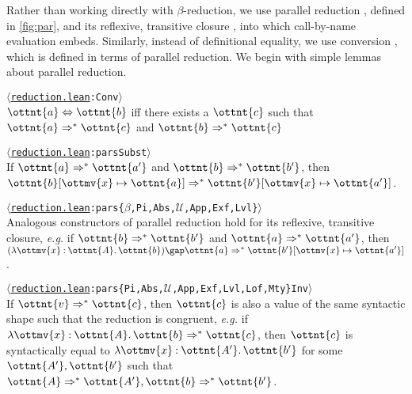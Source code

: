 \documentclass[a4paper,UKenglish,cleveref,autoref,thm-restate]{lipics-v2021}
\makeatletter
\newcommand{\repo}{https://github.com/ionathanch/TTBFL}
\newcommand{\eg}{\textit{e.g.}\@\xspace}
\newcommand{\thmref}[2]{%
  $\langle$\href{\repo/tree/main/src/#1}{\texttt{#1}}\texttt{:#2}$\rangle$%
}
\makeatother
\begin{document}
Rather than working directly with $\beta$-reduction,
we use parallel reduction ,
defined in \cref{fig:par},
and its reflexive, transitive closure ,
into which call-by-name evaluation embeds.
Similarly, instead of definitional equality,
we use conversion ,
which is defined in terms of parallel reduction.
We begin with simple lemmas about parallel reduction.

\begin{definition}[Conversion] \thmref{reduction.lean}{Conv} \\
  $ \ottnt{a}  \Leftrightarrow  \ottnt{b} $ iff there exists a $\ottnt{c}$ such that
  $ \ottnt{a}  \Rightarrow^\ast  \ottnt{c} $ and $ \ottnt{b}  \Rightarrow^\ast  \ottnt{c} $
\end{definition}

\begin{lemma}[Substitution (p.r.)] \thmref{reduction.lean}{parsSubst} \label{lem:pars:subst} \\
  If $ \ottnt{a}  \Rightarrow^\ast  \ottnt{a'} $ and $ \ottnt{b}  \Rightarrow^\ast  \ottnt{b'} $,
  then $  \ottnt{b} [  \ottmv{x}  \mapsto  \ottnt{a}  ]   \Rightarrow^\ast   \ottnt{b'} [  \ottmv{x}  \mapsto  \ottnt{a'}  ]  $.
\end{lemma}

\begin{lemma}[Construction (p.r.)] \thmref{reduction.lean}{pars\{$\beta$,Pi,Abs,$\mathcal{U}$,App,Exf,Lvl\}} \label{lem:pars:cons} \\
  Analogous constructors of parallel reduction hold
  for its reflexive, transitive closure,
  \eg if $ \ottnt{b}  \Rightarrow^\ast  \ottnt{b'} $ and $ \ottnt{a}  \Rightarrow^\ast  \ottnt{a'} $,
  then $   (  \lambda  \ottmv{x}  \mathbin{:}  \ottnt{A}  \mathpunct{.}  \ottnt{b}  )   \gap  \ottnt{a}   \Rightarrow^\ast   \ottnt{b'} [  \ottmv{x}  \mapsto  \ottnt{a'}  ]  $.
\end{lemma}

\begin{lemma}[Inversion (p.r.)] \thmref{reduction.lean}{pars\{Pi,Abs,$\mathcal{U}$,App,Exf,Lvl,Lof,Mty\}Inv} \label{lem:pars:inv} \\
  If $ \ottnt{v}  \Rightarrow^\ast  \ottnt{c} $, then $\ottnt{c}$ is also a value of the same syntactic shape
  such that the reduction is congruent,
  \eg if $  \lambda  \ottmv{x}  \mathbin{:}  \ottnt{A}  \mathpunct{.}  \ottnt{b}   \Rightarrow^\ast  \ottnt{c} $, then $\ottnt{c}$ is syntactically equal to $ \lambda  \ottmv{x}  \mathbin{:}  \ottnt{A'}  \mathpunct{.}  \ottnt{b'} $
  for some $\ottnt{A'}, \ottnt{b'}$ such that $ \ottnt{A}  \Rightarrow^\ast  \ottnt{A'} ,  \ottnt{b}  \Rightarrow^\ast  \ottnt{b'} $.
\end{lemma}
\end{document}
